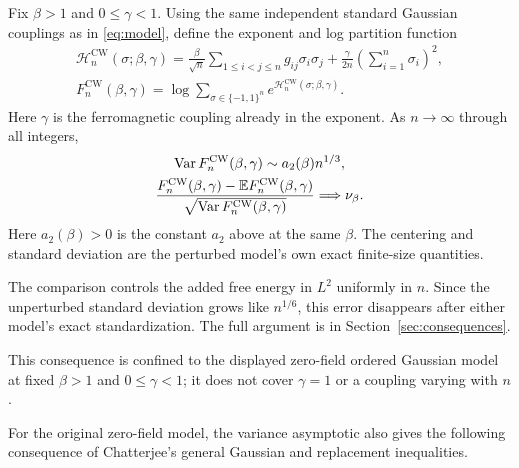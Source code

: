 \begin{corollary}
\label{cor:skcw}
Fix $\beta>1$ and $0\le\gamma<1$. Using the same independent standard
Gaussian couplings as in \eqref{eq:model}, define the exponent and log
partition function
\[
 \begin{gathered}
 \mathcal H_n^{\mathrm{CW}}(\sigma;\beta,\gamma)
 =
 \frac{\beta}{\sqrt n}\sum_{1\le i<j\le n}g_{ij}\sigma_i\sigma_j
 +\frac{\gamma}{2n}\left(\sum_{i=1}^n\sigma_i\right)^2,\\
 F_n^{\mathrm{CW}}(\beta,\gamma)
 =\log\sum_{\sigma\in\{-1,1\}^n}
 e^{\mathcal H_n^{\mathrm{CW}}(\sigma;\beta,\gamma)}.
 \end{gathered}
\]
Here $\gamma$ is the ferromagnetic coupling already in the exponent.
As $n\to\infty$ through all integers,
\[
 \begin{gathered}
 \operatorname{Var} F_n^{\mathrm{CW}}(\beta,\gamma)
 \sim a_2(\beta)n^{1/3},\\
 \frac{F_n^{\mathrm{CW}}(\beta,\gamma)
       -\mathbb E F_n^{\mathrm{CW}}(\beta,\gamma)}
      {\sqrt{\operatorname{Var} F_n^{\mathrm{CW}}(\beta,\gamma)}}
 \Longrightarrow\nu_\beta.
 \end{gathered}
\]
Here $a_2(\beta)>0$ is the constant $a_2$ above at the same $\beta$.
The centering and standard deviation are the perturbed model's own
exact finite-size quantities.
\end{corollary}

The comparison controls the added free energy in $L^2$ uniformly in
$n$. Since the unperturbed standard deviation grows like $n^{1/6}$,
this error disappears after either model's exact standardization.
The full argument is in Section~\ref{sec:consequences}.

This consequence is confined to the displayed zero-field ordered
Gaussian model at fixed $\beta>1$ and $0\le\gamma<1$; it does not cover
$\gamma=1$ or a coupling varying with $n$.

For the original zero-field model, the variance asymptotic also gives
the following consequence of Chatterjee's general Gaussian and
replacement inequalities.

